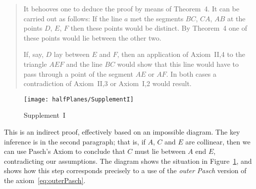 \begin{quotation}\label{sec:SupplementI}
It behooves one to deduce the proof by means of Theorem~4. It can be carried out as follows: If the line $a$ met the segments $BC$, $CA$, $AB$ at the points $D$, $E$, $F$ then these points would be distinct. By Theorem~4 one of these points would lie between the other two.

If, say, $D$ lay between $E$ and $F$, then an application of Axiom~II,4 to the triangle $AEF$ and the line $BC$ would show that this line would have to pass through a point of the segment $AE$ or $AF$. In both cases a contradiction of Axiom~II,3 or Axiom~I,2 would result.
\end{quotation}

\begin{figure}
  \centering\texttt{[image: halfPlanes/SupplementI]}
  \caption{Supplement~I}
  \label{fig:SupplementI}
\end{figure}

This is an indirect proof, effectively based on an impossible diagram. The key inference is in the second paragraph; that is, if $A$, $C$ and $E$ are collinear, then we can use Pasch's Axiom to conclude that $C$ must lie between $A$ end $E$, contradicting our assumptions. The diagram shows the situation in Figure~\ref{fig:SupplementI}, and shows how this step corresponds precisely to a use of the \emph{outer Pasch} version of the axiom~\eqref{eq:outerPasch}.

